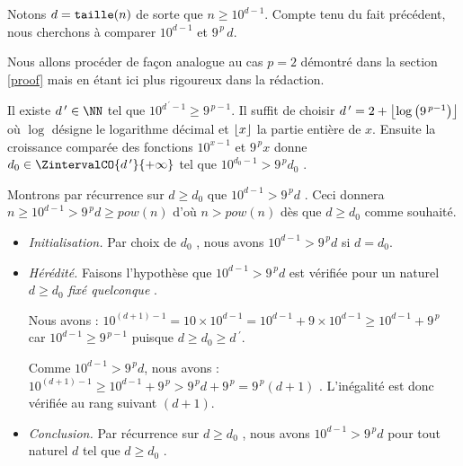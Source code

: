 \begin{proof*}\label{magicmajo-proof}
	Notons $d = \operatorname{\text{\normalfont\texttt{taille}}}(n)$ de sorte que $n \geqslant 10^{d-1}$.
	Compte tenu du fait précédent, nous cherchons à comparer $10^{d-1}$ et $9^{\,p} \, d$.
	
	
	\medskip
	
	Nous allons procéder de façon analogue au cas $p = 2$ démontré dans la section \ref{proof} mais en étant ici plus rigoureux dans la rédaction.
	
	
	\medskip
	
	Il existe $d\,^\prime \in \NN$ tel que $10^{d\,^\prime  - 1} \geqslant 9^{\,p  - 1}$.
	Il suffit de choisir $d\,^\prime = 2 + \left\lfloor  \log \left( 9^{\,p-1} \right)  \right\rfloor$ où $\log$ désigne le logarithme décimal et $\left\lfloor x \right\rfloor$ la partie entière de $x$.
	Ensuite la croissance comparée des fonctions $10^{x - 1}$ et $9^{\,p} x$ donne $d_0 \in \ZintervalCO{d\,^\prime}{+\infty}$ tel que $10^{d_0 - 1} > 9^{\,p} d_0$ .



	\medskip
	
	Montrons par récurrence sur $d \geqslant d_0$ que $10^{d - 1} > 9^{\,p} d$ .
	Ceci donnera $n \geqslant 10^{d - 1} > 9^{\,p} d \geqslant pow(n)$ d'où $n > pow(n)$ dès que $d \geqslant d_0$ comme souhaité.

	\begin{itemize}[label=\small\textbullet]
		\item \emph{Initialisation.}
		Par choix de $d_0$ , nous avons $10^{d-1} > 9^{\,p} d$ si $d = d_0$.

		\item \emph{Hérédité.}
		Faisons l'hypothèse que $10^{d-1} > 9^{\,p} d$ est vérifiée pour un naturel $d \geqslant d_0$ \emph{\og fixé quelconque \fg}.

		\smallskip
		
		\noindent
		Nous avons : $10^{(d+1)-1} = 10\times10^{d-1} = 10^{d-1} + 9\times10^{d-1} \geqslant 10^{d-1} + 9^{\,p}$ car $10^{d-1} \geqslant 9^{\,p  - 1}$ puisque $d \geqslant d_0 \geqslant d\,^\prime$.

		\smallskip
		
		\noindent
		Comme $10^{d-1} > 9^{\,p} d$, nous avons : $10^{(d+1)-1} \geqslant 10^{d-1} + 9^{\,p} > 9^{\,p} d + 9^{\,p} = 9^{\,p} (d+ 1)$ .
		L'inégalité est donc vérifiée au rang suivant $(d+1)$. 

		\item \emph{Conclusion.}
		Par récurrence sur $d \geqslant d_0$ , nous avons $10^{d - 1} > 9^{\,p} d$ pour tout naturel $d$ tel que $d \geqslant d_0$ .
	\end{itemize}
\end{proof*}
	

